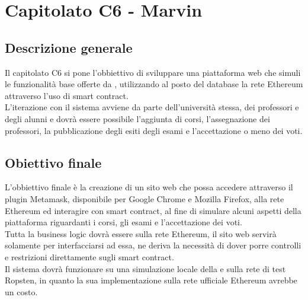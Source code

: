 \documentclass[StudioDiFattibilità.tex]{subfiles}
\begin{document}
\chapter{Capitolato C6 - Marvin}
\section{Descrizione generale}
Il capitolato C6 si pone l'obbiettivo di sviluppare una piattaforma web che simuli le funzionalità base offerte da , utilizzando al posto del database la rete Ethereum attraverso l'uso di smart contract.\\
L'iterazione con il sistema avviene da parte dell'università stessa, dei professori e degli alunni e dovrà essere possibile l'aggiunta di corsi, l'assegnazione dei professori, la pubblicazione degli esiti degli esami e l'accettazione o meno dei voti.
\section{Obiettivo finale}
L'obbiettivo finale è la creazione di un sito web che possa accedere attraverso il plugin Metamask, disponibile per Google Chrome e Mozilla Firefox, alla rete Ethereum ed interagire con smart contract, al fine di simulare alcuni aspetti della piattaforma  riguardanti i corsi, gli esami e l'accettazione dei voti.\\
Tutta la business logic dovrà essere sulla rete Ethereum, il sito web servirà solamente per interfacciarsi ad essa, ne deriva la necessità di dover porre controlli e restrizioni direttamente sugli smart contract.\\
Il sistema dovrà funzionare su una simulazione locale della  e sulla rete di test Ropsten, in quanto la sua implementazione sulla rete ufficiale Ethereum avrebbe un costo.
\end{document}
